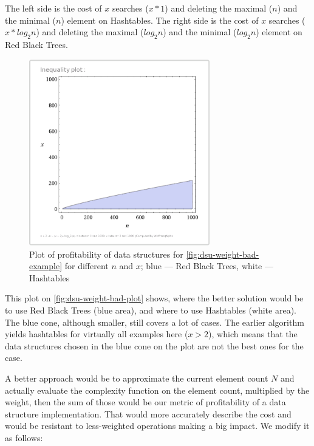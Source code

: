 \documentclass[a4paper,11pt]{article}
\begin{document}
            The left side is the cost of $x$ searches ($x * 1$) and deleting the maximal ($n$) and the minimal ($n$) element on Hashtables.
            The right side is the cost of $x$ searches ($x * log_2 n$) and deleting the maximal ($log_2 n$) and the minimal ($log_2 n$) element on Red Black Trees.
                \begin{figure}[!h]
                \begin{center}
                    \includegraphics[width=0.7\textwidth]{thesis-pics/dsu-weight-example.png}
                \end{center}

                \caption{Plot of profitability of data structures for \autoref{fig:dsu-weight-bad-example} for different
                $n$ and $x$; blue --- Red Black Trees, white --- Hashtables}

                \label{fig:dsu-weight-bad-plot}
            \end{figure}

            This plot on \autoref{fig:dsu-weight-bad-plot} shows, where the better solution would be to use Red Black
            Trees (blue area), and where to use Hashtables (white area). The blue cone, although smaller, still covers a
            lot of cases. The earlier algorithm yields hashtables for virtually all examples here ($x > 2$), which means
            that the data structures chosen in the blue cone on the plot are not the best ones for the case.

            A better approach would be to approximate the current element count $N$ and actually evaluate the complexity
            function on the element count, multiplied by the weight, then the sum of those would be our metric of
            profitability of a data structure implementation. That would more accurately describe the cost and would be
            resistant to less-weighted operations making a big impact. We modify it as follows:
\end{document}
